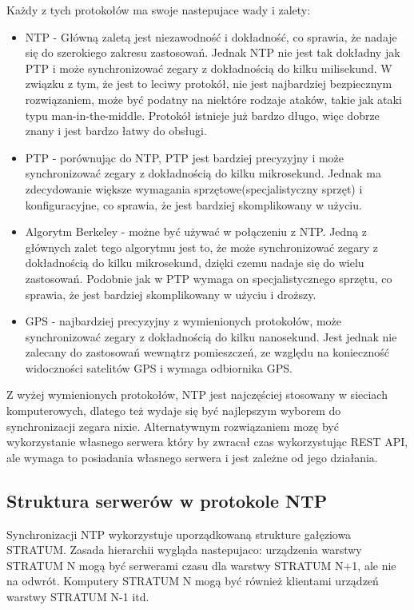 \documentclass[../main.tex]{subfiles}
\begin{document}
\newpage

Każdy z tych protokołów ma swoje nastepujace wady i zalety:

\begin{itemize}
  \item NTP - Główną zaletą jest niezawodność i dokładność, co sprawia, że nadaje się do szerokiego zakresu zastosowań. 
  Jednak NTP nie jest tak dokładny jak PTP i może synchronizować zegary z dokładnością do kilku milisekund.
  W związku z tym, że jest to leciwy protokół, nie jest najbardziej bezpiecznym rozwiązaniem, 
  może być podatny na niektóre rodzaje ataków, takie jak ataki typu man-in-the-middle.
  Protokół istnieje już bardzo długo, więc dobrze znany i jest bardzo łatwy do obsługi.
  \item PTP - porównując do NTP, PTP jest bardziej precyzyjny i może synchronizować zegary z dokładnością do kilku mikrosekund.
  Jednak ma zdecydowanie większe wymagania sprzętowe(specjalistyczny sprzęt) i konfiguracyjne, co sprawia, że jest bardziej skomplikowany w użyciu.
  \item Algorytm Berkeley - możne być używać w połączeniu z NTP. 
  Jedną z głównych zalet tego algorytmu jest to, że może synchronizować zegary z dokładnością do kilku mikrosekund, dzięki czemu nadaje się do wielu zastosowań.
  Podobnie jak w PTP wymaga on specjalistycznego sprzętu, co sprawia, że jest bardziej skomplikowany w użyciu i droższy.
  \item GPS - najbardziej precyzyjny z wymienionych protokołów, może synchronizować zegary z dokładnością do kilku nanosekund.
  Jest jednak nie zalecany do zastosowań wewnątrz pomieszczeń, ze względu na konieczność widoczności satelitów GPS i wymaga odbiornika GPS.
\end{itemize} 

Z wyżej wymienionych protokołów, NTP jest najczęściej stosowany w sieciach komputerowych, dlatego też wydaje się być najlepszym wyborem do synchronizacji zegara nixie.
Alternatywnym rozwiązaniem mozę być wykorzystanie własnego serwera który by zwracał czas wykorzystując REST API, ale wymaga to posiadania własnego serwera i jest zależne od 
jego działania.

\subsection{Struktura serwerów w protokole NTP}
Synchronizacji NTP wykorzystuje uporządkowaną strukture gałęziowa STRATUM. 
Zasada hierarchii wygląda nastepujaco: urządzenia warstwy STRATUM N mogą być serwerami czasu dla warstwy STRATUM N+1, ale nie na odwrót. 
Komputery STRATUM N mogą być również klientami urządzeń warstwy STRATUM N-1 itd.
\end{document}
